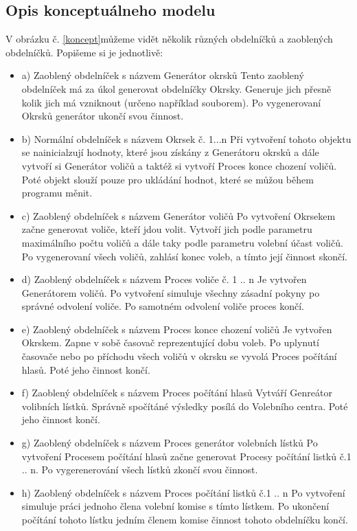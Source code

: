 \documentclass[12pt,a4paper,titlepage,final]{article}
\begin{document}
\subsection{Opis konceptuálneho modelu}
 V obrázku č. \ref{koncept}můžeme vidět několik různých obdelníčků a zaoblených obdelníčků. Popišeme si je jednotlivě: 
 \begin{itemize}
\item    a) Zaoblený obdelníček s názvem Generátor okrsků
\subitem  Tento zaoblený obdelníček má za úkol generovat obdelníčky Okrsky. Generuje jich přesně kolik jich má vzniknout (určeno například souborem). Po vygenerovaní Okrsků generátor ukončí svou činnost.
\item    b) Normální obdelníček s názvem Okrsek č. 1...n
\subitem  Při vytvoření tohoto objektu  se nainicialzují hodnoty, které jsou získány z Generátoru okrsků a dále vytvoří si Generátor voličů a taktéž si vytvoří Proces konce chození voličů. Poté objekt slouží pouze pro ukládání hodnot, které se můžou během programu měnit.
\item    c) Zaoblený obdelníček s názvem Generátor voličů
\subitem  Po vytvoření Okrsekem začne generovat voliče, kteří jdou volit. Vytvoří jich podle parametru maximálního počtu voličů a dále taky podle parametru volební účast voličů. Po vygenerovaní všech voličů, zahlásí konec voleb, a tímto její činnost skončí. 
\item    d) Zaoblený obdelníček s názvem Proces voliče č. 1 .. n
\subitem  Je vytvořen Generátorem voličů. Po vytvoření simuluje všechny zásadní pokyny po správné odvolení voliče. Po samotném odvolení voliče proces končí.
 \item   e) Zaoblený obdelníček s názvem Proces konce chození voličů
\subitem  Je vytvořen Okrskem. Zapne v sobě časovač reprezentující dobu voleb. Po uplynutí časovače nebo po příchodu všech voličů v okrsku se vyvolá Proces počítání hlasů. Poté jeho činnost končí.
\item    f) Zaoblený obdelníček s názvem Proces počítání hlasů
\subitem  Vytváří Genreátor volibních lístků. Správně spočítáné výsledky posílá do Volebního centra. Poté jeho činnost končí.
\item    g) Zaoblený obdelníček s názvem Proces generátor volebních lístků
\subitem  Po vytvoření Procesem počítání hlasů začne generovat Procesy počítání listků č.1 .. n. Po vygerenerování všech lístků zkončí svou činnost.
\item    h) Zaoblený obdelníček s názvem Proces počítání listků č.1 .. n
\subitem  Po vytvoření simuluje práci jednoho člena volební komise s tímto lístkem. Po ukončení počítání tohoto lístku jedním členem komise činnost tohoto obdelníčku končí.
\end{itemize}\newpage 
\end{document}
